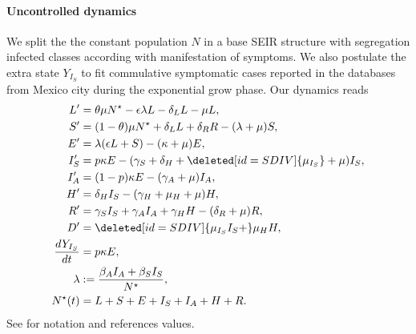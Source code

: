 \paragraph{Uncontrolled dynamics}
	We split the the constant population $N$ in a base SEIR
structure with segregation infected classes according with
manifestation  of symptoms. We also postulate the extra state $Y_{I_S}$ to fit commulative symptomatic cases reported in the databases from Mexico city
during the exponential grow phase. Our dynamics reads
\begin{equation}
	\label{eqn:base_dynamics}
    \begin{aligned}
    	L' & = \theta \mu N^{\star}
        	-\epsilon \lambda L - \delta_L L - \mu L,
    	\\
    	S' & =
        	(1 - \theta)\mu N^\star + \delta_L  L + \delta_R R
        	- (\lambda + \mu) S,
    	\\
    	E' & =
        	\lambda (\epsilon L + S) - (\kappa + \mu) E,
    	\\
    	I_S' & =
        	p \kappa E -
        	(\gamma_S +
        	    \delta_H +
        	    \deleted[id=SDIV]{\mu_{I_S}} +
        	    \mu) I_S,
    	\\
    	I_A' &=
        	(1 - p) \kappa E - (\gamma_A + \mu) I_A,
    	\\
    	H' &=
        	\delta_H I_S - (\gamma_H + \mu_H + \mu) H,
    	\\
    	R' & =
        	\gamma_S I_S + \gamma_A I_A + \gamma_H H - (\delta_R + \mu) R,
    	\\
    	D' &=
        	\deleted[id=SDIV]{\mu_{I_S} I_S +} \mu_H H,
    	\\
    	\frac{dY_{I_S}}{dt} &  = p \kappa E,
    	\\
    	\lambda &:=
        	\frac{\beta_A I_A + \beta_S I_S}{N^{\star}},
    	\\
    	N^{\star}(t) &=
        	L + S + E +
       	 	I_S + I_A +
        	H + R .
    \end{aligned}
\end{equation}
%
     See  for notation and references
     values.

